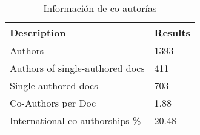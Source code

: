 \begin{table}[htbp]
	\centering
	\begin{tabular}{|l|l|}
		\hline
		\textbf{Description} & \textbf{Results} \\ \hline
		Authors & 1393 \\ \hline
		Authors of single-authored docs & 411 \\ \hline
		Single-authored docs & 703 \\ \hline
		Co-Authors per Doc & 1.88 \\ \hline
		International co-authorships \% & 20.48 \\ \hline
	\end{tabular}
	\caption{Información de co-autorías}
	\label{tb:resumen}
\end{table}